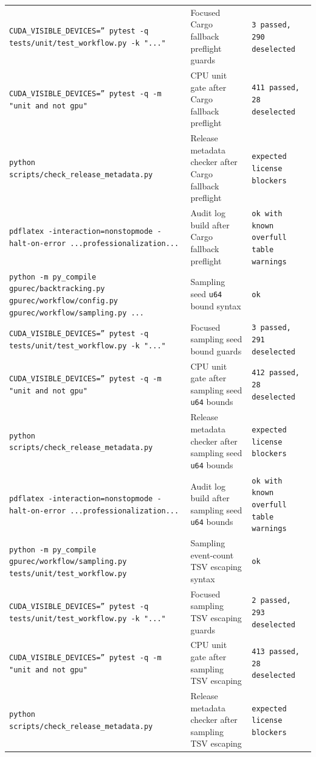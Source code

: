 \documentclass[11pt]{article}
\begin{document}
\begin{center}
\begin{tabular}{lll}
\texttt{CUDA\_VISIBLE\_DEVICES='' pytest -q tests/unit/test\_workflow.py -k "..."} &
Focused Cargo fallback preflight guards &
\texttt{3 passed, 290 deselected} \\
\texttt{CUDA\_VISIBLE\_DEVICES='' pytest -q -m "unit and not gpu"} &
CPU unit gate after Cargo fallback preflight &
\texttt{411 passed, 28 deselected} \\
\texttt{python scripts/check\_release\_metadata.py} &
Release metadata checker after Cargo fallback preflight &
\texttt{expected license blockers} \\
\texttt{pdflatex -interaction=nonstopmode -halt-on-error ...professionalization...} &
Audit log build after Cargo fallback preflight &
\texttt{ok with known overfull table warnings} \\
\texttt{python -m py\_compile gpurec/backtracking.py gpurec/workflow/config.py gpurec/workflow/sampling.py ...} &
Sampling seed \texttt{u64} bound syntax &
\texttt{ok} \\
\texttt{CUDA\_VISIBLE\_DEVICES='' pytest -q tests/unit/test\_workflow.py -k "..."} &
Focused sampling seed bound guards &
\texttt{3 passed, 291 deselected} \\
\texttt{CUDA\_VISIBLE\_DEVICES='' pytest -q -m "unit and not gpu"} &
CPU unit gate after sampling seed \texttt{u64} bounds &
\texttt{412 passed, 28 deselected} \\
\texttt{python scripts/check\_release\_metadata.py} &
Release metadata checker after sampling seed \texttt{u64} bounds &
\texttt{expected license blockers} \\
\texttt{pdflatex -interaction=nonstopmode -halt-on-error ...professionalization...} &
Audit log build after sampling seed \texttt{u64} bounds &
\texttt{ok with known overfull table warnings} \\
\texttt{python -m py\_compile gpurec/workflow/sampling.py tests/unit/test\_workflow.py} &
Sampling event-count TSV escaping syntax &
\texttt{ok} \\
\texttt{CUDA\_VISIBLE\_DEVICES='' pytest -q tests/unit/test\_workflow.py -k "..."} &
Focused sampling TSV escaping guards &
\texttt{2 passed, 293 deselected} \\
\texttt{CUDA\_VISIBLE\_DEVICES='' pytest -q -m "unit and not gpu"} &
CPU unit gate after sampling TSV escaping &
\texttt{413 passed, 28 deselected} \\
\texttt{python scripts/check\_release\_metadata.py} &
Release metadata checker after sampling TSV escaping &
\texttt{expected license blockers} \\

\end{tabular}
\end{center}
\end{document}
